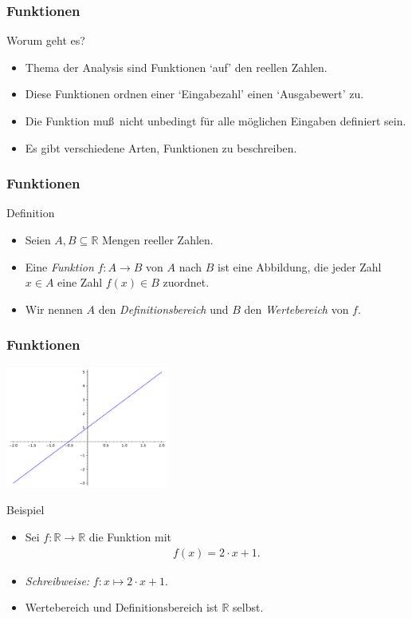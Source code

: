 \documentclass{beamer}
\title[Annuma]{\mytitle}
\author[Amin Coja-Oghlan]{Amin Coja-Oghlan}
\institute[Frankfurt]{JWGUFFM}
\date{}
\renewcommand{\emph}[1]{{\textcolor{solarizedRed}{\itshape #1}}}
\newcommand\RR{\mathbb R}
\renewcommand{\oe}{\"o}
\newcommand{\ue}{\"u}
\newcommand{\mytitle}{Funktionen}
\begin{document}
\frame[plain]{\titlepage}

\begin{frame}\frametitle{\mytitle}
	\begin{block}{Worum geht es?}
		\begin{itemize}
			\item Thema der \alert{Analysis} sind Funktionen `auf' den reellen Zahlen.
			\item Diese Funktionen ordnen einer `Eingabezahl' einen `Ausgabewert' zu.
			\item Die Funktion mu\ss\ nicht unbedingt f\ue r alle m\oe glichen Eingaben definiert sein.
			\item Es gibt verschiedene Arten, Funktionen zu beschreiben.
		\end{itemize}
	\end{block}
\end{frame}

\begin{frame}\frametitle{\mytitle}
	\begin{block}{Definition}
		\begin{itemize}
			\item Seien $A,B\subseteq\RR$ Mengen reeller Zahlen.
			\item Eine \emph{Funktion} $f:A\to B$ von $A$ nach $B$ ist eine Abbildung, die jeder Zahl $x\in A$ eine Zahl $f(x)\in B$ zuordnet.
			\item Wir nennen $A$ den \emph{Definitionsbereich} und $B$ den \emph{Wertebereich} von $f$.
		\end{itemize}
	\end{block}
\end{frame}

\begin{frame}\frametitle{\mytitle}
	\hfill\includegraphics[height=40mm]{pics/graph_linear.pdf}
	\begin{block}{Beispiel}
		\begin{itemize}
			\item Sei $f:\RR\to \RR$ die Funktion mit
				\begin{align*}
					f(x)=2\cdot x+1.
				\end{align*}
			\item \emph{Schreibweise:} $f:x\mapsto 2\cdot x+1$.
			\item Wertebereich und Definitionsbereich ist $\RR$ selbst.
		\end{itemize}
	\end{block}
\end{frame}
\end{document}
